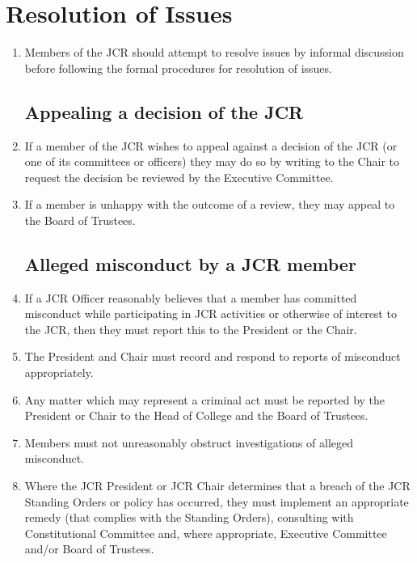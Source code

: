 \documentclass[12pt]{article}
\begin{document}
\section{Resolution of Issues}
\begin{enumerate}
    \item Members of the JCR should attempt to resolve issues by informal discussion before following the formal procedures for resolution of issues.
    \subsection{Appealing a decision of the JCR}
    \item If a member of the JCR wishes to appeal against a decision of the JCR (or one of its committees or officers) they may do so by writing to the Chair to request the decision be reviewed by the Executive Committee.
    \item If a member is unhappy with the outcome of a review, they may appeal to the Board of Trustees.
    \subsection{Alleged misconduct by a JCR member}
    \item If a JCR Officer reasonably believes that a member has committed misconduct while participating in JCR activities or otherwise of interest to the JCR, then they must report this to the President or the Chair.
    \item The President and Chair must record and respond to reports of misconduct appropriately.
    \item Any matter which may represent a criminal act must be reported by the President or Chair to the Head of College and the Board of Trustees.
    \item Members must not unreasonably obstruct investigations of alleged misconduct.
    \item Where the JCR President or JCR Chair determines that a breach of the JCR Standing Orders or policy has occurred, they must implement an appropriate remedy (that complies with the Standing Orders), consulting with Constitutional Committee and, where appropriate, Executive Committee and/or Board of Trustees.
\end{enumerate}
\end{document}

